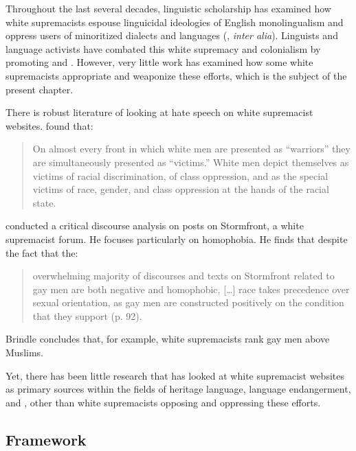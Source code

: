 \documentclass[output=paper,colorlinks,citecolor=brown]{langscibook}
\begin{document}
Throughout the last several decades, linguistic scholarship has examined how white supremacists espouse linguicidal ideologies of English monolingualism and oppress users of  minoritized dialects and languages (\citealt{jp:Kroskrity2021}, \emph{inter alia}). Linguists and language activists have combated this white supremacy and colonialism by promoting  and  \citep{jp:Hintonetal2018}. However, very little work has examined how some white suprem\-a\-cists appropriate and weaponize these efforts, which is the subject of the present chapter.

There is robust literature of looking at hate speech on white supremacist websites. \citet[37]{jp:Daniels1997} found that:

\begin{quote}
On almost every front in which white men are presented as “warriors” they are simultaneously presented as “victims.” White men depict themselves as victims of racial discrimination, of class oppression, and as the special victims of race, gender, and class oppression at the hands of the racial state.
\end{quote}

\noindent \citet{jp:Bridle2016} conducted a critical discourse analysis on posts on Stormfront, a white supremacist forum. He focuses particularly on homophobia. He finds that despite the fact that the:

\begin{quote}
overwhelming majority of discourses and texts on Stormfront related to gay men are both negative and homophobic, {[}\ldots{]} race takes precedence over sexual orientation, as gay men are constructed positively on the condition that they support  (p. 92).
\end{quote}

\noindent Brindle concludes that, for example, white supremacists rank gay men above Muslims.

Yet, there has been little research that has looked at white supremacist websites as primary sources within the fields of heritage language, language endangerment, and , other than white supremacists opposing and oppressing these efforts.


\subsection{Framework}\label{sec:powell:1.2}
\end{document}
